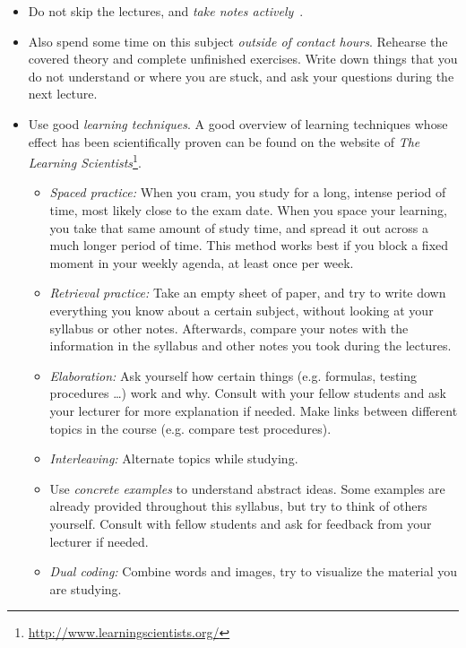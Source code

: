 \begin{itemize}
    \item Do not skip the lectures, and \emph{take notes actively}~\parencite{Lundin2020}.
    \item Also spend some time on this subject \emph{outside of contact hours}. Rehearse the covered theory and complete unfinished exercises.
    Write down things that you do not understand or where you are stuck, and ask your questions during the next lecture.
    \item Use good \emph{learning techniques}. A good overview of learning techniques whose effect has been scientifically proven can be found on the website of \emph{The Learning Scientists}\footnote{\url{http://www.learningscientists.org/}}.
    \begin{itemize}
        \item \emph{Spaced practice:} When you cram, you study for a long, intense period of time, most likely close to the exam date. When you space your learning, you take that same amount of study time, and spread it out across a much longer period of time.
        This method works best if you block a fixed moment in your weekly agenda, at least once per week.
        \item \emph{Retrieval practice:} Take an empty sheet of paper, and try to write down everything you know about a certain subject,
        without looking at your syllabus or other notes. Afterwards, compare your notes with the information in the syllabus and other notes you took during the lectures.
        \item \emph{Elaboration:} Ask yourself how certain things (e.g. formulas, testing procedures \ldots) work and why. Consult with your fellow students and ask your lecturer for more explanation if needed. Make links between different topics in the course (e.g. compare test procedures).
        \item \emph{Interleaving:} Alternate topics while studying.
        \item Use \emph{concrete examples} to understand abstract ideas.
        Some examples are already provided throughout this syllabus, but try to think of others yourself. Consult with fellow students and ask for feedback from your lecturer if needed.
        
        \item \emph{Dual coding:} Combine words and images, try to visualize the material you are studying.
    \end{itemize}
\end{itemize}

